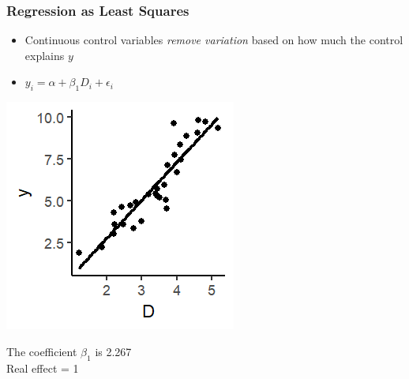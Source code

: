 \documentclass[xcolor=x11names,compress]{beamer}\usepackage[]{graphicx}\usepackage[]{color}
\makeatletter
\def\maxwidth{ %
  \ifdim\Gin@nat@width>\linewidth
    \linewidth
  \else
    \Gin@nat@width
  \fi
}
\newenvironment{knitrout}{}{} %
\renewcommand{\(}{\begin{columns}}
\renewcommand{\)}{\end{columns}}
\newcommand{\<}[1]{\begin{column}{#1}}
\renewcommand{\>}{\end{column}}
\makeatother
\begin{document}
\begin{frame}
\frametitle{Regression as Least Squares}
\begin{itemize}
\item Continuous control variables \textit{remove variation} based on how much the control explains $y$
\item $y_i = \alpha + \beta_1 D_i + \epsilon_i$
\end{itemize}
\begin{multicols}{2}
\begin{knitrout}
\color{fgcolor}
\includegraphics[width=\maxwidth]{figure/graph_ols_control1-1} 

\end{knitrout}
\columnbreak

The coefficient $\beta_1$ is 2.267 \\
Real effect = 1
\end{multicols}
\end{frame}
\end{document}
